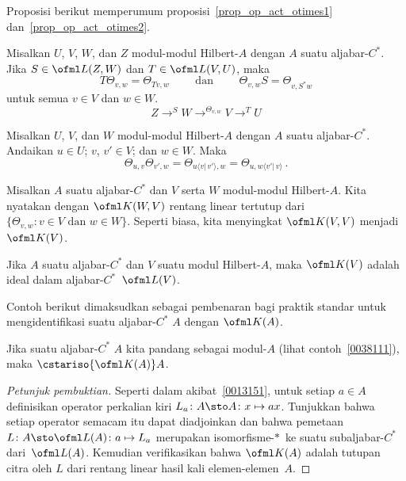 Proposisi berikut memperumum proposisi~\ref{prop_op_act_otimes1} dan~\ref{prop_op_act_otimes2}.

\begin{prop} Misalkan $U$, $V$, $W$, dan $Z$ modul-modul Hilbert-$A$ dengan $A$ suatu aljabar-$C^*$.
Jika $S \in \ofml L(Z,W)$ dan $T \in \ofml L(V,U)$, maka
  \[ T \Theta_{v,w} = \Theta_{Tv,w} \qquad \text{ dan } \qquad
                               \Theta_{v,w} S = \Theta_{v,S^*w} \]
untuk semua $v \in V$ dan $w \in W$.
  \[ Z \to^S W \to^{\Theta_{v,w}} V \to^T U \]
\end{prop}

\begin{prop} Misalkan $U$, $V$, dan $W$ modul-modul Hilbert-$A$ dengan $A$ suatu aljabar-$C^*$.
Andaikan $u \in U$; $v$, $v' \in V$; dan $w \in W$. Maka
  \[ \Theta_{u,v}\Theta_{v',w} = \Theta_{u\langle v \vert\,v' \rangle, w}
                               = \Theta_{u, w\langle v'\vert\,v \rangle}\,. \]
\end{prop}

\begin{notn}\label{0038331} Misalkan $A$ suatu aljabar-$C^*$ dan $V$ serta $W$
modul-modul Hilbert-$A$. Kita nyatakan dengan
$\ofml K(W,V)$ rentang linear tertutup dari $\{\Theta_{v,w}\colon v \in V \text{ dan } w \in
W\}$. Seperti biasa, kita menyingkat $\ofml K(V,V)$ menjadi~$\ofml K(V)$.
\end{notn}

\begin{prop}\label{0038334} Jika $A$ suatu aljabar-$C^*$ dan $V$
suatu modul Hilbert-$A$, maka $\ofml K(V)$ adalah ideal dalam aljabar-$C^*$~$\ofml L(V)$.
\end{prop}

Contoh berikut dimaksudkan sebagai pembenaran bagi praktik standar untuk mengidentifikasi suatu
aljabar-$C^*$ $A$ dengan $\ofml K(A)$.

\begin{exam}\label{0038337} Jika suatu aljabar-$C^*$ $A$ kita pandang sebagai modul-$A$ (lihat
contoh~\ref{0038111}), maka $\cstariso{\ofml K(A)}A$.
\end{exam}

\begin{proof}[\emph{Petunjuk pembuktian}] Seperti dalam akibat~\ref{0013151}, untuk setiap
$a \in A$ definisikan operator perkalian kiri $L_a\colon A \sto A\colon x \mapsto ax$. Tunjukkan
bahwa setiap operator semacam itu dapat diadjoinkan dan bahwa pemetaan $L\colon A \sto \ofml L(A) \colon
a \mapsto L_a$ merupakan isomorfisme-$*\,$ ke suatu subaljabar-$C^*$ dari~$\ofml L(A)$. Kemudian
verifikasikan bahwa $\ofml K(A)$ adalah tutupan citra oleh $L$ dari rentang linear hasil kali
elemen-elemen~$A$. \ns
\end{proof}

